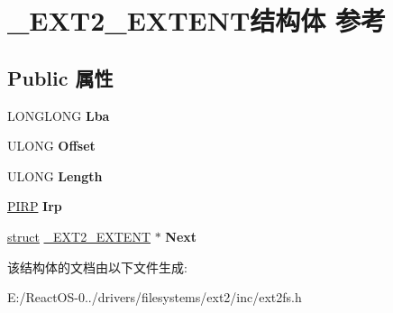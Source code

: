 \hypertarget{struct___e_x_t2___e_x_t_e_n_t}{}\section{\+\_\+\+E\+X\+T2\+\_\+\+E\+X\+T\+E\+N\+T结构体 参考}
\label{struct___e_x_t2___e_x_t_e_n_t}
\subsection*{Public 属性}
\begin{DoxyCompactItemize}
\item 
\mbox{\label{struct___e_x_t2___e_x_t_e_n_t_a85ad0c3bbfbe7d26f861b24889e16f27}} 
L\+O\+N\+G\+L\+O\+NG {\bfseries Lba}
\item 
\mbox{\label{struct___e_x_t2___e_x_t_e_n_t_ac0c629f0cf5cb2c505c0a2cf710452ad}} 
U\+L\+O\+NG {\bfseries Offset}
\item 
\mbox{\label{struct___e_x_t2___e_x_t_e_n_t_a3faa9dc63fb60123f3e05667cb92fc90}} 
U\+L\+O\+NG {\bfseries Length}
\item 
\mbox{\label{struct___e_x_t2___e_x_t_e_n_t_ab6874af81960af83d287b20efc9af6aa}} 
\hyperlink{interfacevoid}{P\+I\+RP} {\bfseries Irp}
\item 
\mbox{\label{struct___e_x_t2___e_x_t_e_n_t_aa20afd62511a748afbbea3528161c26f}} 
\hyperlink{interfacestruct}{struct} \hyperlink{struct___e_x_t2___e_x_t_e_n_t}{\+\_\+\+E\+X\+T2\+\_\+\+E\+X\+T\+E\+NT} $\ast$ {\bfseries Next}
\end{DoxyCompactItemize}


该结构体的文档由以下文件生成\+:\begin{DoxyCompactItemize}
\item 
E\+:/\+React\+O\+S-\/0../drivers/filesystems/ext2/inc/ext2fs.\+h\end{DoxyCompactItemize}
